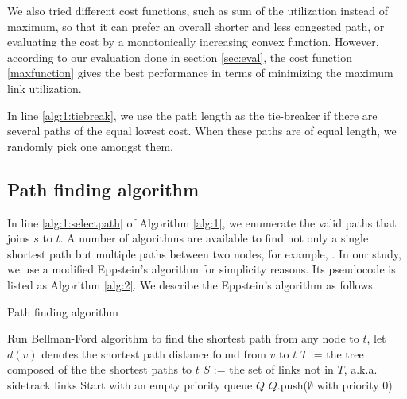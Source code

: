 \documentclass[conference]{IEEEtran}
\begin{document}
We also tried different cost functions, such as sum of the utilization instead
of maximum, so that it can prefer an overall shorter and less congested path,
or evaluating the cost by a monotonically increasing convex function. However,
according to our evaluation done in section \ref{sec:eval}, the cost function
\eqref{maxfunction} gives the best performance in terms of minimizing the
maximum link utilization.

In line \ref{alg:1:tiebreak}, we use the path length as the tie-breaker if
there are several paths of the equal lowest cost. When these paths are of equal
length, we randomly pick one amongst them.

\subsection{Path finding algorithm}

In line \ref{alg:1:selectpath} of Algorithm \ref{alg:1}, we enumerate the valid
paths that joins $s$ to $t$. A number of algorithms are available to find not
only a single shortest path but multiple paths between two nodes, for example,
\cite{y71,m78}. In our study, we use a modified Eppstein's algorithm \cite{e98}
for simplicity reasons. Its pseudocode is listed as Algorithm \ref{alg:2}. We
describe the Eppstein's algorithm as follows.

\begin{algorithm}
\caption{Path finding algorithm}\label{alg:2}
Run Bellman-Ford algorithm to find the shortest path from any node to $t$,
let $d(v)$ denotes the shortest path distance found from $v$ to $t$\;
$T$ := the tree composed of the the shortest paths to $t$\;
$S$ := the set of links not in $T$, a.k.a. sidetrack links\;
Start with an empty priority queue $Q$\;
$Q$.push($\emptyset$ with priority 0)\;
\end{algorithm}
\end{document}
